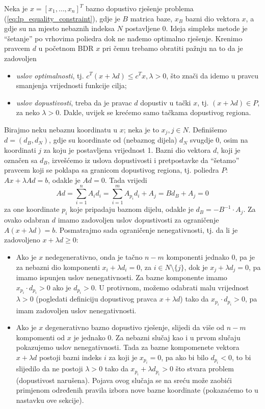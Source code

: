 \documentclass[a4paper, utf8, 11pt, colorlinks]{book}
\begin{document}
 Neka je $x = [x_1,\ldots, x_n]^T$ bazno dopustivo rješenje problema (\ref{eq:lp_equality_constraint}), gdje je $B$ matrica baze, $x_B$ bazni dio vektora $x$, a gdje su na mjesto nebaznih indeksa $N$ postavljene 0.  Ideja simpleks metode je  ``šetanje'' po vrhovima poliedra  dok ne nađemo optimalno rješenje. Krenimo pravcem $d$ u  početnom BDR $x$  pri čemu trebamo obratiti  pažnju na to da je zadovoljen
\begin{itemize}
    \item \emph{uslov optimalnosti}, tj. $c^T (x + \lambda d) \leq c^T x, \lambda>0$, što znači da idemo u pravcu smanjenja vrijednosti funkcije cilja;
    \item \emph{uslov dopustivosti}, treba da je pravac $d$ dopustiv u tački $x$, tj. $ (x + \lambda d) \in P$, za neko $\lambda>0$. Dakle, uvijek se krećemo samo tačkama dopustivog regiona. 
\end{itemize}
Birajmo neku nebaznu koordinatu u $x$; neka je to $x_j, j \in N$. Definišemo $d=(d_B,  d_N)$, gdje su koordinate od (nebaznog dijela) $d_N$ svugdje 0, osim na koordinati $j$ za koju je postavljena vrijednost 1.   Bazni dio vektora $d$, koji je označen sa $d_B$, izvešćemo iz uslova dopustivosti i pretpostavke da ``šetamo'' pravcem koji se poklapa sa granicom dopustivog regiona, tj. poliedra $P$: $Ax + \lambda Ad = b$, odakle je $Ad = 0$. Tada vrijedi
$$ Ad = \sum_{i=1}^n A_i d_i = \sum_{i=1}^m A_{p_i} d_i + A_j = B d_B + A_j = 0$$ za one koordinate $p_i$ koje pripadaju baznom dijelu, 
odakle je $d_B = -  B^{-1} \cdot A_j $.  Za ovako odabran $d$ imamo zadovoljen uslov dopustivosti za ograničenje $A( x + \lambda d )  =b$. Posmatrajmo sada ograničenje nenegativnosti, tj. da li je zadovoljeno $x + \lambda d \geq 0$:
\begin{itemize}
    \item Ako je $x$ nedegenerativno, onda je tačno $n-m$ komponenti jednako 0,       pa je za nebazni dio komponenti $x_i + \lambda d_i = 0$, za $i \in N \setminus \{j\}$, dok je $x_j + \lambda d_j = 0$, pa imamo ispunjen uslov nenegativnosti. Za bazne komponente imamo $x_{p_i} \cdot d_{p_i} > 0 $ ako je $d_{p_i}>0$. U protivnom, možemo odabrati  malu vrijednost  $\lambda>0$ (pogledati definiciju dopustivog pravca $x +\lambda d$) tako da $x_{p_i} \cdot d_{p_i} >0$, pa imam zadovoljen uslov nenegativnosti.
    \item Ako je $x$ degenerativno bazno dopustivo rješenje, slijedi da više od $n-m$ kompomenti od $x$ je jednako 0. Za nebazni slučaj kao i u prvom slučaju pokazujemo uslov nenegativnosti. Tada za bazne kompomenete vektora $x +\lambda d$  postoji bazni indeks $i$ za koji je $x_{p_i} = 0$, pa ako bi bilo $d_{p_i}< 0$, to bi slijedilo da ne postoji $\lambda>0$ tako da $x_{p_i} + \lambda d_{p_i} >0$  što stvara problem (dopustivost narušena). Pojava ovog slučaja se na sreću može zaobići primjenom određenih pravila izbora nove bazne koordinate (pokazaćemo to u nastavku ove sekcije). 
\end{itemize}
\end{document}
